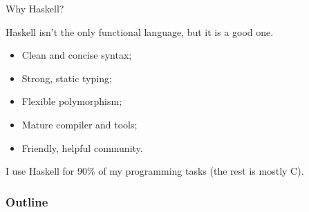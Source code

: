 %
\begin{frame}{Why Haskell?}

Haskell isn't the only functional language, but it is a good one.

\begin{itemize}
  \item Clean and concise syntax;
  \item Strong, static typing;
  \item Flexible polymorphism;
  \item Mature compiler and tools;
  \item Friendly, helpful community.
\end{itemize}

I use Haskell for 90\% of my programming tasks (the rest is mostly C).

\end{frame}

\begin{frame}
  \frametitle{Outline}
  \tableofcontents
\end{frame}

% 
% 
% 
% 
% 
